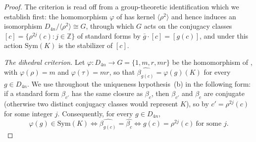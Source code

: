 \documentclass[11pt]{article}
\theoremstyle{definition}
\begin{document}
\begin{proof}
\noindent The criterion is read off from a group-theoretic identification which we
establish first: the homomorphism $\varphi$ of  has kernel
$\langle\rho^{2}\rangle$ and hence induces an isomorphism
$D_{4n}/\langle\rho^{2}\rangle\cong G$, through which $G$ acts on the conjugacy classes
$[c]=\{\rho^{2j}(c):j\in\mathbb{Z}\}$ of standard forms by $\bar g\cdot[c]=[g(c)]$, and
under this action $\mathrm{Sym}(K)$ is the stabilizer of $[c]$.

\smallskip
\noindent\emph{The dihedral criterion.}
Let $\varphi\colon D_{4n}\to G=\{1,m,r,mr\}$ be the homomorphism of
, with $\varphi(\rho)=m$ and $\varphi(\tau)=mr$, so that
$\widehat{\beta_{g(c)}}=\varphi(g)(K)$ for every $g\in D_{4n}$. We use throughout the
uniqueness hypothesis~(b) in the following form: if a standard form $\beta_{c'}$ has the
same closure as $\beta_c$, then $\beta_{c'}$ and $\beta_c$ are conjugate (otherwise two
distinct conjugacy classes would represent $K$), so by
 $c'=\rho^{2j}(c)$ for some integer $j$. Consequently,
for every $g\in D_{4n}$,
\[
\varphi(g)\in\mathrm{Sym}(K)
\iff \widehat{\beta_{g(c)}}=\widehat{\beta_c}
\iff g(c)=\rho^{2j}(c)\ \text{for some }j .
\tag{$\ast$}
\]


\end{proof}
\end{document}

